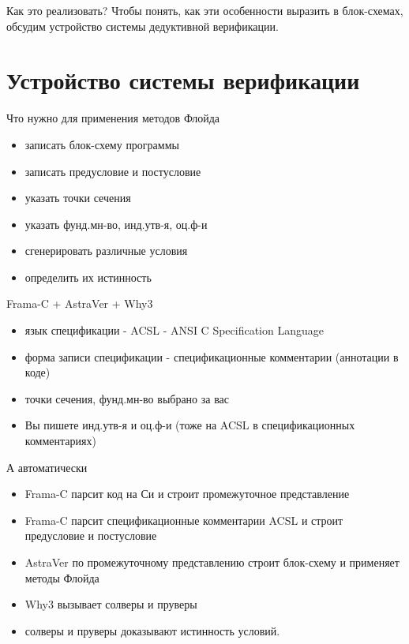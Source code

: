 \documentclass[hyperref={unicode=true}]{beamer}
\begin{document}
    \begin{frame}{Как это реализовать?}
    Чтобы понять, как эти особенности выразить в блок-схемах, обсудим
    устройство системы дедуктивной верификации.
    \end{frame}

    \section{Устройство системы верификации}

    \begin{frame}{Что нужно для применения методов Флойда}
    \begin{itemize}
    \item записать блок-схему программы
    \item записать предусловие и постусловие
    \item указать точки сечения
    \item указать фунд.мн-во, инд.утв-я, оц.ф-и
    \item сгенерировать различные условия
    \item определить их истинность
    \end{itemize}
    \end{frame}

    \begin{frame}{Frama-C + AstraVer + Why3}
    \begin{itemize}
    \item язык спецификации - ACSL - ANSI C Specification Language
    \item форма записи спецификации - спецификационные комментарии (аннотации
            в коде)
    \item точки сечения, фунд.мн-во выбрано за вас
    \item Вы пишете инд.утв-я и оц.ф-и (тоже на ACSL в спецификационных
            комментариях)
    \end{itemize}
    \end{frame}

    \begin{frame}{А автоматически}
    \begin{itemize}
    \item Frama-C парсит код на Си и строит промежуточное представление
    \item Frama-C парсит спецификационные комментарии ACSL и строит
            предусловие и постусловие
    \item AstraVer по промежуточному представлению строит блок-схему и
            применяет методы Флойда
    \item Why3 вызывает солверы и пруверы
    \item солверы и пруверы доказывают истинность условий.
    \end{itemize}
    \end{frame}
\end{document}
